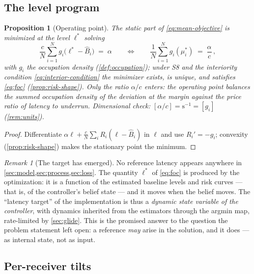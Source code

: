 \documentclass[11pt, a4paper]{article}
\theoremstyle{definition}
\theoremstyle{plain}
\newtheorem{proposition}[theorem]{Proposition}
\theoremstyle{remark}
\newtheorem{remark}{Remark}[section]
\begin{document}
\subsection{The level program}\label{sec:level-program}

\begin{proposition}[Operating point]\label{prop:foc}
The static part of \cref{eq:mean-objective} is minimized at the level
$\ell^*$ solving
\begin{equation}\label{eq:foc}
  \frac{c}{N}\sum_{i=1}^{N} g_i\bigl(\ell^* - \hat B_i\bigr)
  \;=\; \alpha
  \qquad\Longleftrightarrow\qquad
  \frac1N\sum_{i=1}^{N} g_i(\mu_i^*) \;=\; \frac{\alpha}{c}\,,
\end{equation}
with $g_i$ the occupation density (\cref{def:occupation}); under S8
and the interiority condition \cref{eq:interior-condition} the
minimizer exists, is unique, and satisfies \cref{eq:foc}
(\cref{prop:risk-shape}).  Only the ratio $\alpha/c$ enters: the operating point balances the summed
occupation density of the deviation at the margin against the price
ratio of latency to underrun.  Dimensional check: $[\alpha/c] =
\mathrm{s}^{-1} = [g_i]$ (\cref{rem:units}).
\end{proposition}

\begin{proof}
Differentiate $\alpha\ell + \tfrac{c}{N}\sum_i R_i(\ell - \hat B_i)$
in $\ell$ and use $R_i' = -g_i$; convexity (\cref{prop:risk-shape})
makes the stationary point the minimum.
\end{proof}

\begin{remark}[The target has emerged]\label{rem:emergence}
No reference latency appears anywhere in
\cref{sec:model,sec:process,sec:loss}.  The quantity $\ell^*$ of
\cref{eq:foc} is produced by the optimization: it is a function of the
estimated baseline levels and risk curves --- that is, of the
controller's belief state --- and it moves when the belief moves.  The
``latency target'' of the implementation is thus a \emph{dynamic state
variable of the controller}, with dynamics inherited from the
estimators through the argmin map, rate-limited by \cref{sec:glide}.
This is the promised answer to the question the problem statement left
open: a reference \emph{may} arise in the solution, and it does ---
as internal state, not as input.
\end{remark}

\subsection{Per-receiver tilts}\label{sec:tilt}
\end{document}
